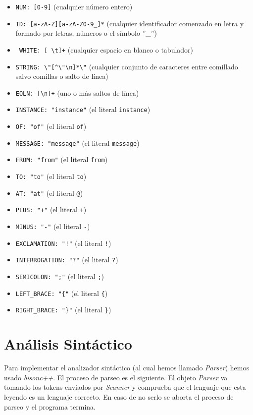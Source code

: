 \begin{itemize}
\item \lstinline{NUM: [0-9]} (cualquier número entero)
\item \lstinline{ID: [a-zA-Z][a-zA-Z0-9_]*} (cualquier identificador
  comenzado  en letra y formado por letras, números o el símbolo ''\_'')
\item\lstinline{ WHITE: [ \t]+} (cualquier espacio en blanco o tabulador)
\item \lstinline{STRING: \"[^\"\n]*\"} (cualquier conjunto de caracteres entre
  comillado salvo comillas o salto de línea)
\item \lstinline{EOLN: [\n]+} (uno o más saltos de línea)
\item \lstinline{INSTANCE: "instance"} (el literal \lstinline{instance})
\item \lstinline{OF: "of"} (el literal \lstinline{of})
\item \lstinline{MESSAGE: "message"} (el literal \lstinline{message})
\item \lstinline{FROM: "from"} (el literal \lstinline{from})
\item \lstinline{TO: "to"} (el literal \lstinline{to})
\item \lstinline{AT: "at"} (el literal \lstinline{@})
\item \lstinline{PLUS: "+"} (el literal \lstinline{+})
\item \lstinline{MINUS: "-"} (el literal \lstinline{-})
\item \lstinline{EXCLAMATION: "!"} (el literal \lstinline{!})
\item \lstinline{INTERROGATION: "?"} (el literal \lstinline{?})
\item \lstinline{SEMICOLON: ";"} (el literal \lstinline{;})
\item \lstinline!LEFT_BRACE: "{"! (el literal \lstinline!{!)
\item \lstinline!RIGHT_BRACE: "}"! (el literal \lstinline!}!)
\end{itemize}

\section{Análisis Sintáctico}

Para implementar el analizador sintáctico (al cual hemos llamado
\textit{Parser}) hemos usado \textit{bisonc++}. El proceso de parseo
es el siguiente. El objeto \textit{Parser} va tomando los tokens
enviados por \textit{Scanner} y comprueba que el lenguaje que esta
leyendo es un lenguaje correcto. En caso de no serlo se aborta el
proceso de parseo y el programa termina.

